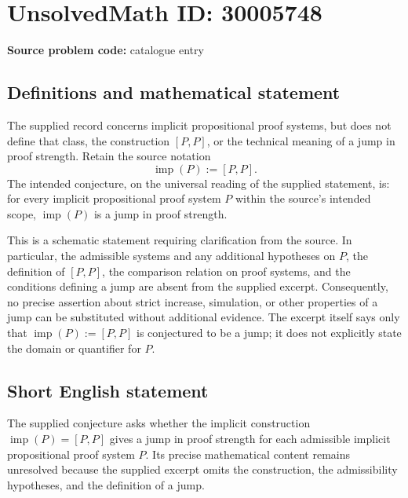 \documentclass[11pt]{article}
\begin{document}
\section*{UnsolvedMath ID: 30005748}
\textbf{Source problem code:} catalogue entry
\subsection{Definitions and mathematical statement}
The supplied record concerns implicit propositional proof systems, but does not define that class, the construction \([P,P]\), or the technical meaning of a jump in proof strength. Retain the source notation
\[
\operatorname{imp}(P):=[P,P].
\]
The intended conjecture, on the universal reading of the supplied statement, is: for every implicit propositional proof system \(P\) within the source's intended scope, \(\operatorname{imp}(P)\) is a jump in proof strength.

This is a schematic statement requiring clarification from the source. In particular, the admissible systems and any additional hypotheses on \(P\), the definition of \([P,P]\), the comparison relation on proof systems, and the conditions defining a jump are absent from the supplied excerpt. Consequently, no precise assertion about strict increase, simulation, or other properties of a jump can be substituted without additional evidence. The excerpt itself says only that \(\operatorname{imp}(P):=[P,P]\) is conjectured to be a jump; it does not explicitly state the domain or quantifier for \(P\).
\subsection{Short English statement}
The supplied conjecture asks whether the implicit construction \(\operatorname{imp}(P)=[P,P]\) gives a jump in proof strength for each admissible implicit propositional proof system \(P\). Its precise mathematical content remains unresolved because the supplied excerpt omits the construction, the admissibility hypotheses, and the definition of a jump.
\end{document}
